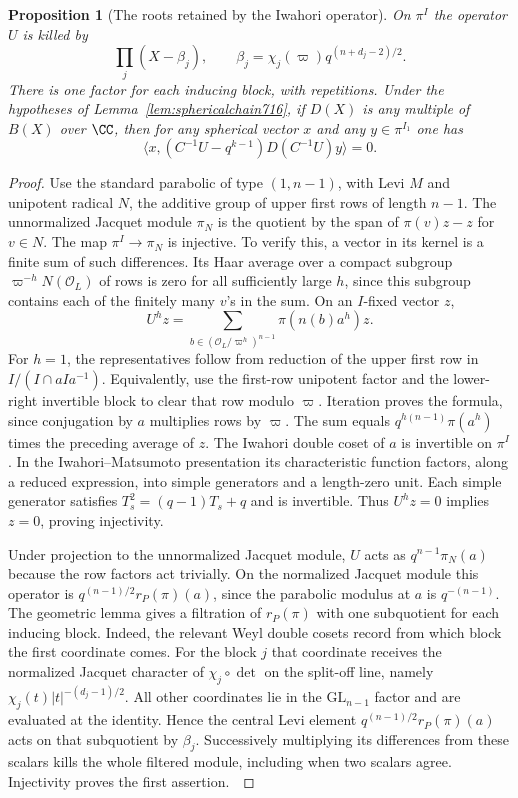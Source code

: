 \documentclass[a4paper,11pt]{article}
\newtheorem{proposition}{Proposition}[section]
\theoremstyle{definition}
\theoremstyle{remark}
\numberwithin{equation}{section}
\begin{document}
\begin{proposition}[The roots retained by the Iwahori operator]
\leavevmode\label{prop:toproots716}
On \(\pi^I\) the operator \(U\) is killed by
\[
       \prod_j(X-\beta_j),\qquad
       \beta_j=\chi_j(\varpi)q^{(n+d_j-2)/2}.
\]
There is one factor for each inducing block, with repetitions.
Under the hypotheses of Lemma~\ref{lem:sphericalchain716}, if
\(D(X)\) is any multiple of \(B(X)\) over \(\CC\), then for any
spherical vector \(x\) and any \(y\in\pi^{I_1}\) one has
\[
       \big\langle x,(C^{-1}U-q^{k-1})D(C^{-1}U)y\big\rangle=0 .
\]
\end{proposition}
\begin{proof}
Use the standard parabolic of type \((1,n-1)\), with Levi
\(M\) and unipotent radical \(N\), the additive group of
upper first rows of length \(n-1\). The unnormalized Jacquet
module \(\pi_N\) is the quotient by the span of
\(\pi(v)z-z\) for \(v\in N\). The map \(\pi^I\to\pi_N\)
is injective. To verify this, a vector in its kernel is a
finite sum of such differences. Its Haar average over a
compact subgroup \(\varpi^{-h}N(\mathcal O_L)\) of rows is
zero for all sufficiently large \(h\), since this subgroup
contains each of the finitely many \(v\)'s in the sum.
On an \(I\)-fixed vector \(z\),
\[
    U^h z=\sum_{b\in(\mathcal O_L/\varpi^h)^{n-1}}
                   \pi(n(b)a^h)z .
\]
For \(h=1\), the representatives follow from reduction of the
upper first row in \(I/(I\cap aIa^{-1})\). Equivalently, use
the first-row unipotent factor and the lower-right invertible
block to clear that row modulo \(\varpi\). Iteration proves the
formula, since conjugation by \(a\) multiplies rows by
\(\varpi\). The sum equals \(q^{h(n-1)}\pi(a^h)\) times the
preceding average of \(z\). The Iwahori double coset of \(a\)
is invertible on \(\pi^I\). In the Iwahori--Matsumoto
presentation its characteristic function factors, along a
reduced expression, into simple generators and a length-zero
unit. Each simple generator satisfies
\(T_s^2=(q-1)T_s+q\) and is invertible. Thus \(U^h z=0\)
implies \(z=0\), proving injectivity.~\cite{IX-VII-VII-im716}

Under projection to the unnormalized Jacquet module, \(U\)
acts as \(q^{n-1}\pi_N(a)\) because the row factors act
trivially. On the normalized Jacquet module this operator
is \(q^{(n-1)/2}r_P(\pi)(a)\), since the parabolic modulus
at \(a\) is \(q^{-(n-1)}\). The geometric lemma gives a
filtration of \(r_P(\pi)\) with one subquotient for each
inducing block. Indeed, the relevant Weyl double cosets
record from which block the first coordinate comes.
For the block \(j\) that coordinate receives the normalized
Jacquet character of \(\chi_j\circ\det\) on the split-off
line, namely \(\chi_j(t)|t|^{-(d_j-1)/2}\). All other
coordinates lie in the \(\mathrm{GL}_{n-1}\) factor and
are evaluated at the identity. Hence the central Levi
element \(q^{(n-1)/2}r_P(\pi)(a)\) acts on that subquotient
by \(\beta_j\). Successively multiplying its differences
from these scalars kills the whole filtered module, including
when two scalars agree. Injectivity proves the first
assertion.~\cite[\S2.12]{IX-VII-VII-bzgeom716}


\end{proof}
\end{document}
